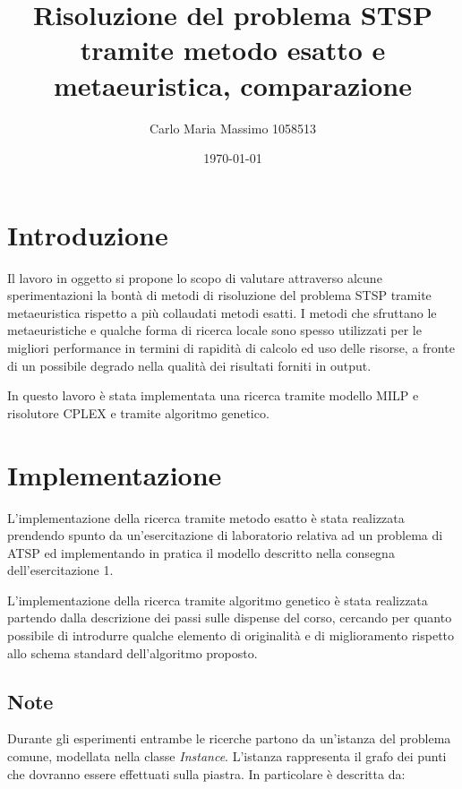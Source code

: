 \documentclass[12pt,a4paper]{article}
\begin{document}
\title{Risoluzione del problema STSP tramite metodo esatto e metaeuristica, comparazione}
\author{Carlo Maria Massimo 1058513}
\date{\today}
\maketitle

\tableofcontents

    \section{Introduzione}
        Il lavoro in oggetto si propone lo scopo di valutare attraverso alcune sperimentazioni la bont\`a di metodi
        di risoluzione del problema STSP tramite metaeuristica rispetto a pi\`u collaudati metodi esatti.
        I metodi che sfruttano le metaeuristiche e qualche forma di ricerca locale sono spesso utilizzati per le migliori
        performance in termini di rapidit\`a di calcolo ed uso delle risorse, a fronte di un possibile degrado nella qualit\`a
        dei risultati forniti in output.

        In questo lavoro \`e stata implementata una ricerca tramite modello MILP e risolutore CPLEX e tramite algoritmo genetico.

    \section{Implementazione}
        L'implementazione della ricerca tramite metodo esatto \`e stata realizzata prendendo spunto da un'esercitazione di laboratorio
        relativa ad un problema di ATSP ed implementando in pratica il modello descritto nella consegna dell'esercitazione 1.

        L'implementazione della ricerca tramite algoritmo genetico \`e stata realizzata partendo dalla descrizione dei passi
        sulle dispense del corso, cercando per quanto possibile di introdurre qualche elemento di originalit\`a e di miglioramento rispetto
        allo schema standard dell'algoritmo proposto.

        \subsection{Note}
        Durante gli esperimenti entrambe le ricerche partono da un'istanza del problema comune, modellata nella classe \emph{Instance}.
        L'istanza rappresenta il grafo dei punti che dovranno essere effettuati sulla piastra.
        In particolare \`e descritta da:
\end{document}
